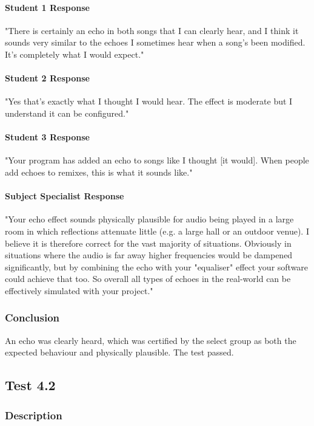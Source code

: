\paragraph{Student 1 Response}
"There is certainly an echo in both songs that I can clearly hear, and I think it sounds very similar to the echoes I sometimes hear when a song's been modified. It's completely what I would expect."

\paragraph{Student 2 Response}
"Yes that's exactly what I thought I would hear. The effect is moderate but I understand it can be configured."

\paragraph{Student 3 Response}
"Your program has added an echo to songs like I thought [it would]. When people add echoes to remixes, this is what it sounds like."

\paragraph{Subject Specialist Response}
"Your echo effect sounds physically plausible for audio being played in a large room in which reflections attenuate little (e.g. a large hall or an outdoor venue). I believe it is therefore correct for the vast majority of situations. Obviously in situations where the audio is far away higher frequencies would be dampened significantly, but by combining the echo with your "equaliser" effect your software could achieve that too. So overall all types of echoes in the real-world can be effectively simulated with your project."

\subsubsection*{Conclusion}
An echo was clearly heard, which was certified by the select group as both the expected behaviour and physically plausible. The test passed.


\pagebreak
\subsection{Test 4.2}
\subsubsection*{Description}
